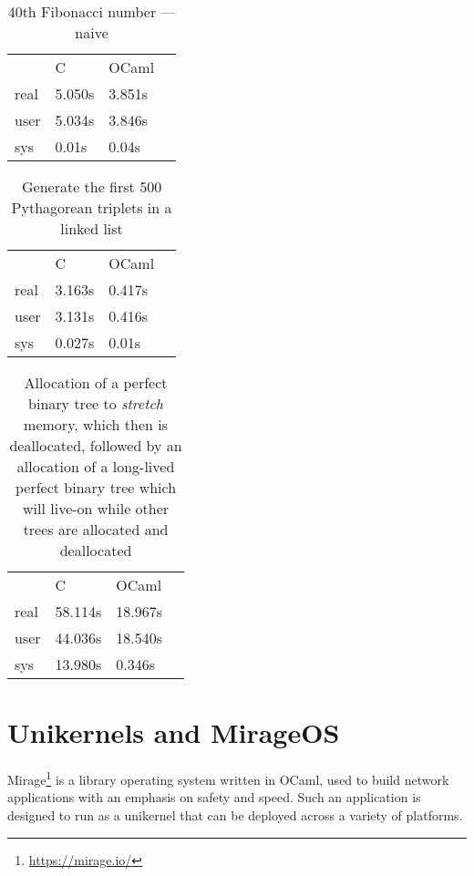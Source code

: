 \begin{table}
    \centering
    \caption{40th Fibonacci number --- naive}
    \begin{tabular}{llll}\label{tab:fibtab}
             & C      & OCaml  & \\
        real & 5.050s & 3.851s & \\
        user & 5.034s & 3.846s & \\
        sys  & 0.01s  & 0.04s  &
    \end{tabular}
\end{table}

\begin{table}
    \centering
    \caption{Generate the first 500 Pythagorean triplets in a linked list}
    \begin{tabular}{llll}\label{tab:pythagtab}
             & C      & OCaml  & \\
        real & 3.163s & 0.417s & \\
        user & 3.131s & 0.416s & \\
        sys  & 0.027s & 0.01s  &
    \end{tabular}
\end{table}


\begin{table}
    \centering
    \caption{Allocation of a perfect binary tree to \emph{stretch} memory, which then is deallocated, followed by an allocation of a long-lived perfect binary tree which will live-on while other trees are allocated and deallocated}
    \begin{tabular}{llll}\label{tab:bintreetab}
             & C       & OCaml   & \\
        real & 58.114s & 18.967s & \\
        user & 44.036s & 18.540s & \\
        sys  & 13.980s & 0.346s  &
    \end{tabular}
\end{table}



\section{Unikernels and MirageOS}\label{sec:mirage}
Mirage\footnote{\url{https://mirage.io/}} is a library operating system written in OCaml, used to build network
applications with an emphasis on safety and speed.
Such an application is designed to run as a unikernel that can be
deployed across a variety of platforms.

